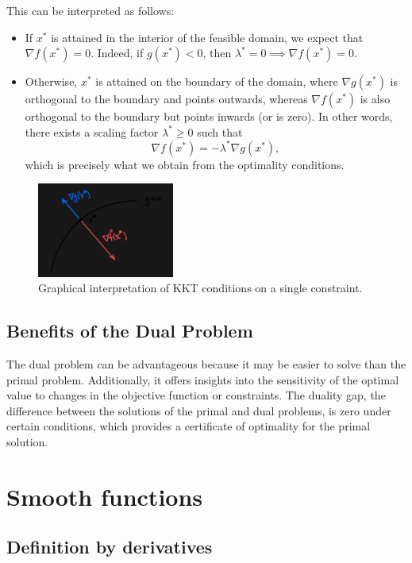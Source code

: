 \documentclass[11pt]{book} %
\begin{document}
This can be interpreted as follows:

\begin{itemize}
    \item If $x^*$ is attained in the interior of the feasible domain, we expect that $\nabla f(x^*) = 0$. Indeed, if $g(x^*) < 0$, then $\lambda^* = 0 \implies \nabla f(x^*) = 0$.
    \item Otherwise, $x^*$ is attained on the boundary of the domain, where $\nabla g(x^*)$ is orthogonal to the boundary and points outwards, whereas $\nabla f(x^*)$ is also orthogonal to the boundary but points inwards (or is zero). In other words, there exists a scaling factor $\lambda^* \geq 0$ such that
    \[
        \nabla f(x^*) = -\lambda^* \nabla g(x^*),
    \]
    which is precisely what we obtain from the optimality conditions.
\end{itemize}


\begin{figure}[]
\centering
\includegraphics[width=0.4\textwidth]{Figs/kkt.png}
\caption{Graphical interpretation of KKT conditions on a single constraint.}
\label{fig:kkt}
\end{figure}


\subsection{Benefits of the Dual Problem}

The dual problem can be advantageous because it may be easier to solve than the primal problem. Additionally, it offers insights into the sensitivity of the optimal value to changes in the objective function or constraints. The duality gap, the difference between the solutions of the primal and dual problems, is zero under certain conditions, which provides a certificate of optimality for the primal solution.

%
%
%

\section{Smooth functions}
\subsection{Definition by derivatives}
\end{document}
